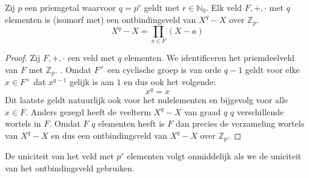 \documentclass[main.tex]{subfiles}
\begin{document}
\begin{st}
  \label{st:priemveld-is-ontbindingsveld}
  Zij $p$ een priemgetal waarvoor $q=p^{r}$ geldt met $r\in \mathbb{N}_{0}$.
  Elk veld $F,+,\cdot$ met $q$ elementen is (isomorf met) een ontbindingsveld van $X^{q}-X$ over $\mathbb{Z}_p$.
  \[ X^{q}-X = \prod_{a\in F}(X-a) \]

  \begin{proof}
    Zij $F,+,\cdot$ een veld met $q$ elementen.
    We identificeren het priemdeelveld van $F$ met $\mathbb{Z}_{p}$. .
    Omdat $F^{\times}$ een cyclische groep is van orde $q-1$ geldt voor elke $x\in F^{\times}$ dat $x^{q-1}$ gelijk is aan $1$ en dus ook het volgende:
    \[ x^{q} = x \]
    Dit laatste geldt natuurlijk ook voor het nulelementen en bijgevolg voor alle $x\in F$.
    Anders gezegd heeft de veelterm $X^{q}-X$ van graad $q$ $q$ verschillende wortels in $F$.
    Omdat $F$ $q$ elementen heeft is $F$ dan precies de verzameling wortels van $X^{q}-X$ en dus een ontbindingsveld van $X^{q}-X$ over $\mathbb{Z}_{p}$.
  \end{proof}
\end{st}


\begin{opm}
  De uniciteit van het veld met $p^{r}$ elementen volgt onmiddelijk als we de uniciteit van het ontbindingsveld gebruiken.
\end{opm}
\end{document}
